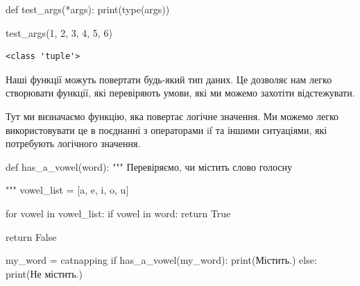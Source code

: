 \documentclass[
  letterpaper,
]{report}
\newenvironment{Shaded}{\begin{snugshade}}{\end{snugshade}}
\newcommand{\BuiltInTok}[1]{\textcolor[rgb]{0.00,0.23,0.31}{#1}}
\newcommand{\CommentTok}[1]{\textcolor[rgb]{0.37,0.37,0.37}{#1}}
\newcommand{\ControlFlowTok}[1]{\textcolor[rgb]{0.00,0.23,0.31}{#1}}
\newcommand{\DecValTok}[1]{\textcolor[rgb]{0.68,0.00,0.00}{#1}}
\newcommand{\KeywordTok}[1]{\textcolor[rgb]{0.00,0.23,0.31}{#1}}
\newcommand{\NormalTok}[1]{\textcolor[rgb]{0.00,0.23,0.31}{#1}}
\newcommand{\OperatorTok}[1]{\textcolor[rgb]{0.37,0.37,0.37}{#1}}
\newcommand{\StringTok}[1]{\textcolor[rgb]{0.13,0.47,0.30}{#1}}
\newcommand{\VariableTok}[1]{\textcolor[rgb]{0.07,0.07,0.07}{#1}}
\begin{document}
\begin{Shaded}
\begin{Highlighting}[]
\KeywordTok{def}\NormalTok{ test\_args(}\OperatorTok{*}\NormalTok{args):}
    \BuiltInTok{print}\NormalTok{(}\BuiltInTok{type}\NormalTok{(args))}

\NormalTok{test\_args(}\DecValTok{1}\NormalTok{, }\DecValTok{2}\NormalTok{, }\DecValTok{3}\NormalTok{, }\DecValTok{4}\NormalTok{, }\DecValTok{5}\NormalTok{, }\DecValTok{6}\NormalTok{)}
\end{Highlighting}
\end{Shaded}

\begin{verbatim}
<class 'tuple'>
\end{verbatim}

Наші функції можуть повертати будь-який тип даних. Це дозволяє нам легко
створювати функції, які перевіряють умови, які ми можемо захотіти
відстежувати.

Тут ми визначаємо функцію, яка повертає логічне значення. Ми можемо
легко використовувати це в поєднанні з операторами if та іншими
ситуаціями, які потребують логічного значення.

\begin{Shaded}
\begin{Highlighting}[]
\KeywordTok{def}\NormalTok{ has\_a\_vowel(word):}
    \CommentTok{"""}
\CommentTok{    Перевіряємо, чи містить слово голосну}

\CommentTok{    """}
\NormalTok{    vowel\_list }\OperatorTok{=}\NormalTok{ [}\StringTok{\textquotesingle{}a\textquotesingle{}}\NormalTok{, }\StringTok{\textquotesingle{}e\textquotesingle{}}\NormalTok{, }\StringTok{\textquotesingle{}i\textquotesingle{}}\NormalTok{, }\StringTok{\textquotesingle{}o\textquotesingle{}}\NormalTok{, }\StringTok{\textquotesingle{}u\textquotesingle{}}\NormalTok{]}

    \ControlFlowTok{for}\NormalTok{ vowel }\KeywordTok{in}\NormalTok{ vowel\_list:}
        \ControlFlowTok{if}\NormalTok{ vowel }\KeywordTok{in}\NormalTok{ word:}
            \ControlFlowTok{return} \VariableTok{True}

    \ControlFlowTok{return} \VariableTok{False}
\end{Highlighting}
\end{Shaded}

\begin{Shaded}
\begin{Highlighting}[]
\NormalTok{my\_word }\OperatorTok{=} \StringTok{\textquotesingle{}catnapping\textquotesingle{}}
\ControlFlowTok{if}\NormalTok{ has\_a\_vowel(my\_word):}
    \BuiltInTok{print}\NormalTok{(}\StringTok{\textquotesingle{}Містить.\textquotesingle{}}\NormalTok{)}
\ControlFlowTok{else}\NormalTok{:}
    \BuiltInTok{print}\NormalTok{(}\StringTok{\textquotesingle{}Не містить.\textquotesingle{}}\NormalTok{)}
\end{Highlighting}
\end{Shaded}
\end{document}
